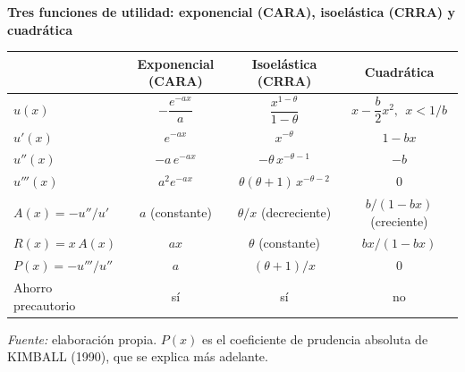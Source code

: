 \documentclass[10pt,a4paper]{article}
\begin{document}
\begin{center}\begin{minipage}{\linewidth}\centering
{\small\textbf{Tres funciones de utilidad: exponencial (CARA), isoelástica (CRRA) y cuadrática}}\par\vspace{0.3em}
{\footnotesize\renewcommand{\arraystretch}{1.6}%
\begin{tabular}{|l|c|c|c|}
\hline
 & \textbf{Exponencial (CARA)} & \textbf{Isoelástica (CRRA)} & \textbf{Cuadrática} \tabularnewline\hline
$u(x)$ & $-\dfrac{e^{-ax}}{a}$ & $\dfrac{x^{1-\theta}}{1-\theta}$ & $x-\dfrac{b}{2}x^{2},\ \ x<1/b$ \tabularnewline\hline
$u'(x)$ & $e^{-ax}$ & $x^{-\theta}$ & $1-bx$ \tabularnewline\hline
$u''(x)$ & $-a\,e^{-ax}$ & $-\theta\,x^{-\theta-1}$ & $-b$ \tabularnewline\hline
$u'''(x)$ & $a^{2}e^{-ax}$ & $\theta(\theta+1)\,x^{-\theta-2}$ & $0$ \tabularnewline\hline
$A(x)=-u''/u'$ & $a$ (constante) & $\theta/x$ (decreciente) & $b/(1-bx)$ (creciente) \tabularnewline\hline
$R(x)=x\,A(x)$ & $ax$ & $\theta$ (constante) & $bx/(1-bx)$ \tabularnewline\hline
$P(x)=-u'''/u''$ & $a$ & $(\theta+1)/x$ & $0$ \tabularnewline\hline
Ahorro precautorio & sí & sí & no \tabularnewline\hline
\end{tabular}}\par\vspace{0.3em}
{\small\textit{Fuente: }elaboración propia. $P(x)$ es el coeficiente de prudencia absoluta de KIMBALL (1990), que se explica más adelante.}
\end{minipage}\end{center}
\end{document}
